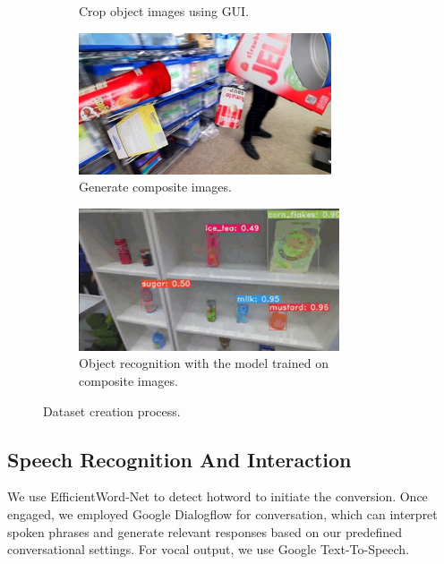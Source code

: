 \documentclass[runningheads,a4paper]{llncs}
\begin{document}
\begin{figure}[tbp]
\begin{subfigure}[t]{0.42\linewidth}
		\caption{Crop object images using GUI.}
	\end{subfigure}
	\vfill
	\begin{subfigure}[t]{0.42\linewidth}
		\includegraphics[width=1.0\linewidth]{images/dataset3.png}
		\caption{Generate composite images.}
	\end{subfigure}
	\begin{subfigure}[t]{0.42\linewidth}
		\includegraphics[width=1.0\linewidth]{images/dataset4.png}
		\caption{Object recognition with the model trained on composite images.}
	\end{subfigure}
	\caption{Dataset creation process.}
	\label{fig:dataset}
\end{figure}

\subsection{Speech Recognition And Interaction}

We use EfficientWord-Net\cite{efficientnet} to detect hotword to initiate the conversion.
Once engaged, we employed Google Dialogflow for conversation, which can interpret spoken phrases and generate relevant responses based on our predefined conversational settings.
For vocal output, we use Google Text-To-Speech.
\end{document}
